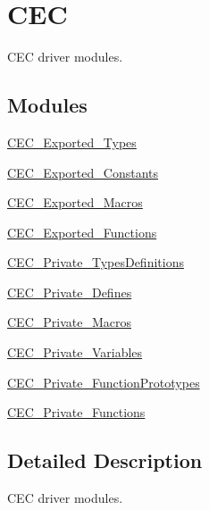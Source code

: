 \hypertarget{group___c_e_c}{}\section{C\+EC}
\label{group___c_e_c}


C\+EC driver modules.  


\subsection*{Modules}
\begin{DoxyCompactItemize}
\item 
\hyperlink{group___c_e_c___exported___types}{C\+E\+C\+\_\+\+Exported\+\_\+\+Types}
\item 
\hyperlink{group___c_e_c___exported___constants}{C\+E\+C\+\_\+\+Exported\+\_\+\+Constants}
\item 
\hyperlink{group___c_e_c___exported___macros}{C\+E\+C\+\_\+\+Exported\+\_\+\+Macros}
\item 
\hyperlink{group___c_e_c___exported___functions}{C\+E\+C\+\_\+\+Exported\+\_\+\+Functions}
\item 
\hyperlink{group___c_e_c___private___types_definitions}{C\+E\+C\+\_\+\+Private\+\_\+\+Types\+Definitions}
\item 
\hyperlink{group___c_e_c___private___defines}{C\+E\+C\+\_\+\+Private\+\_\+\+Defines}
\item 
\hyperlink{group___c_e_c___private___macros}{C\+E\+C\+\_\+\+Private\+\_\+\+Macros}
\item 
\hyperlink{group___c_e_c___private___variables}{C\+E\+C\+\_\+\+Private\+\_\+\+Variables}
\item 
\hyperlink{group___c_e_c___private___function_prototypes}{C\+E\+C\+\_\+\+Private\+\_\+\+Function\+Prototypes}
\item 
\hyperlink{group___c_e_c___private___functions}{C\+E\+C\+\_\+\+Private\+\_\+\+Functions}
\end{DoxyCompactItemize}


\subsection{Detailed Description}
C\+EC driver modules. 

